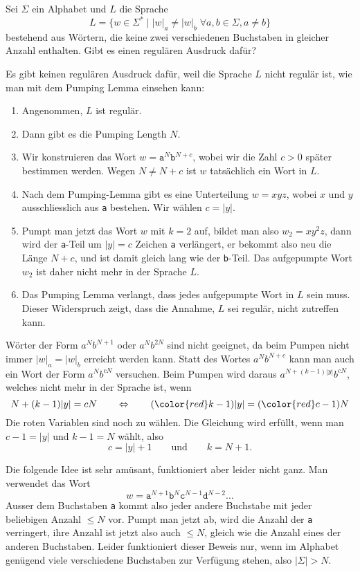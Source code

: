 Sei $\Sigma$ ein Alphabet und $L$ die Sprache
\[
L=\{ w\in\Sigma^* \mid |w|_a \ne |w|_b\;\forall a,b\in\Sigma, a\ne b\}
\]
bestehend aus Wörtern, die keine zwei verschiedenen Buchstaben in gleicher
Anzahl enthalten.
Gibt es einen regulären Ausdruck dafür?


\begin{loesung}
Es gibt keinen regulären Ausdruck dafür, weil die Sprache $L$ nicht regulär
ist, wie man mit dem Pumping Lemma einsehen kann:
\begin{enumerate}
\item Angenommen, $L$ ist regulär.
\item Dann gibt es die Pumping Length $N$.
\item Wir konstruieren das Wort $w=\texttt{a}^N\texttt{b}^{N+c}$, wobei
wir die Zahl $c>0$ später bestimmen werden.
Wegen $N\ne N+c$ ist $w$ tatsächlich ein Wort in $L$.
\item Nach dem Pumping-Lemma gibt es eine Unterteilung $w=xyz$, wobei
$x$ und $y$ ausschliesslich aus \texttt{a} bestehen.
Wir wählen $c=|y|$.
\item Pumpt man jetzt das Wort $w$ mit $k=2$ auf, bildet man also
$w_2=xy^2z$, dann wird der \texttt{a}-Teil um $|y|=c$ Zeichen \texttt{a}
verlängert, er bekommt also neu die Länge $N+c$, und ist damit gleich
lang wie der \texttt{b}-Teil.
Das aufgepumpte Wort $w_2$ ist daher nicht mehr in der Sprache $L$.
\item Das Pumping Lemma verlangt, dass jedes aufgepumpte Wort in $L$
sein muss.
Dieser Widerspruch zeigt, dass die Annahme, $L$ sei regulär, nicht
zutreffen kann.
\qedhere
\end{enumerate}
\end{loesung}

\begin{diskussion}
Wörter der Form $a^Nb^{N+1}$ oder $a^Nb^{2N}$ sind nicht geeignet, da
beim Pumpen nicht immer $|w|_a=|w|_b$ erreicht werden kann.
Statt des Wortes $a^Nb^{N+c}$ kann man auch ein Wort der Form $a^Nb^{cN}$
versuchen.
Beim Pumpen wird daraus
$a^{N+(k-1)|y|}b^{cN}$, welches nicht mehr in der Sprache ist, wenn
\[
N+(k-1)|y|=cN
\qquad\Leftrightarrow\qquad
({\color{red}k}-1)|y|=({\color{red}c}-1)N
\]
Die {\color{red}roten} Variablen sind noch zu wählen.
Die Gleichung wird erfüllt, wenn man $c-1=|y|$ und $k-1=N$ wählt, also
\[
c=|y|+1\qquad\text{und}\qquad k=N+1.
\]

Die folgende Idee ist sehr amüsant, funktioniert aber leider nicht ganz.
Man verwendet das Wort
\[
w=\texttt{a}^{N+1}\texttt{b}^N\texttt{c}^{N-1}\texttt{d}^{N-2}\dots
\]
Ausser dem Buchstaben \texttt{a} kommt also jeder andere Buchstabe
mit jeder beliebigen Anzahl $\le N$ vor. 
Pumpt man jetzt ab, wird die Anzahl der \texttt{a} verringert, ihre
Anzahl ist jetzt also auch $\le N$, gleich wie die Anzahl eines der
anderen Buchstaben.
Leider funktioniert dieser Beweis nur, wenn im Alphabet genügend viele
verschiedene Buchstaben zur Verfügung stehen, also $|\Sigma| > N$.
\end{diskussion}

